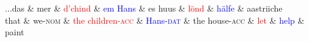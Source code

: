 \documentclass[border=2mm]{standalone}
\begin{document}
\begin{dependency}[arc edge, arc angle=80, text only label, label style={above}, hide label]
    \begin{deptext}
       ...das \& mer \& \textcolor{red}{d'chind} \& \textcolor{blue}{em Hans} \& es huus \& \textcolor{red}{l\"{o}nd} \& \textcolor{blue}{h\"{a}lfe} \& aastriiche \\
       that \& we-\textsc{nom} \& \textcolor{red}{the children-\textsc{acc}} \& \textcolor{blue}{Hans-\textsc{dat}} \& the house-\textsc{acc} \& \textcolor{red}{let} \& \textcolor{blue}{help} \& paint \\
    \end{deptext}
\end{dependency}
\end{document}
